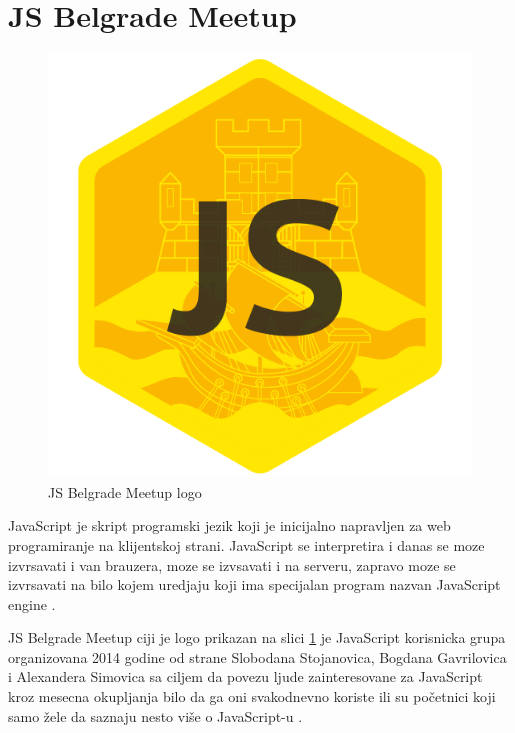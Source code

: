 \documentclass[a4paper]{article}
\begin{document}
{\section{JS Belgrade Meetup}
\label{sec:JSBM}

\begin{figure}[h!]
\begin{center}
\includegraphics[scale=0.25]{JS_logo.png}
\end{center}
\caption{JS Belgrade Meetup logo}
\label{fig:JS_slika}
\end{figure}

JavaScript je skript programski jezik koji je inicijalno napravljen za web programiranje na klijentskoj strani. JavaScript se interpretira i danas se moze izvrsavati i van brauzera, moze se izvsavati i na serveru, zapravo moze se izvrsavati na bilo kojem uredjaju koji ima specijalan program nazvan JavaScript engine \cite{aboutJS}. 

JS Belgrade Meetup ciji je logo prikazan na slici \ref{fig:JS_slika} je JavaScript korisnicka grupa organizovana 2014 godine od strane Slobodana Stojanovica, Bogdana Gavrilovica i Alexandera Simovica sa ciljem da povezu ljude zainteresovane za JavaScript kroz mesecna okupljanja bilo da ga oni svakodnevno koriste ili su početnici koji samo žele da saznaju nesto više o JavaScript-u \cite{JS_Belgrade_meetup_pocetna}. 

}
\end{document}
